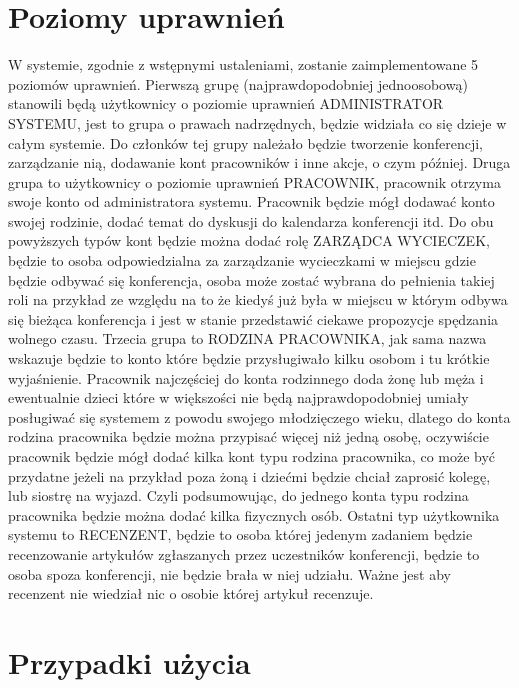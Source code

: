 \section{Poziomy uprawnień}

W systemie, zgodnie z wstępnymi ustaleniami, zostanie zaimplementowane 5 poziomów uprawnień. \newline
Pierwszą grupę (najprawdopodobniej jednoosobową) stanowili będą użytkownicy o poziomie uprawnień ADMINISTRATOR SYSTEMU, jest to grupa o prawach nadrzędnych, będzie widziała co się dzieje w całym systemie. Do członków tej grupy należało będzie tworzenie konferencji, zarządzanie nią, dodawanie kont pracowników i inne akcje, o czym później. \newline
Druga grupa to użytkownicy o poziomie uprawnień PRACOWNIK, pracownik otrzyma swoje konto od administratora systemu. Pracownik będzie mógł dodawać konto swojej rodzinie, dodać temat do dyskusji do kalendarza konferencji itd. \newline
Do obu powyższych typów kont będzie można dodać rolę ZARZĄDCA WYCIECZEK, będzie to osoba odpowiedzialna za zarządzanie wycieczkami w miejscu gdzie będzie odbywać się konferencja, osoba może zostać wybrana do pełnienia takiej roli na przykład ze względu na to że kiedyś już była w miejscu w którym odbywa się bieżąca konferencja i jest w stanie przedstawić ciekawe propozycje spędzania wolnego czasu. \newline
Trzecia grupa to RODZINA PRACOWNIKA, jak sama nazwa wskazuje będzie to konto które będzie przysługiwało kilku osobom i tu krótkie wyjaśnienie. Pracownik najczęściej do konta rodzinnego doda żonę lub męża i ewentualnie dzieci które w większości nie będą najprawdopodobniej umiały posługiwać się systemem z powodu swojego młodzięczego wieku, dlatego do konta rodzina pracownika będzie można przypisać więcej niż jedną osobę, oczywiście pracownik będzie mógł dodać kilka kont typu rodzina pracownika, co może być przydatne jeżeli na przykład poza żoną i dziećmi będzie chciał zaprosić kolegę, lub siostrę na wyjazd. Czyli podsumowując, do jednego konta typu rodzina pracownika będzie można dodać kilka fizycznych osób. \newline
Ostatni typ użytkownika systemu to RECENZENT, będzie to osoba której jedenym zadaniem będzie recenzowanie artykułów zgłaszanych przez uczestników konferencji, będzie to osoba spoza konferencji, nie będzie brała w niej udziału. Ważne jest aby recenzent nie wiedział nic o osobie której artykuł recenzuje.

\section{Przypadki użycia}

